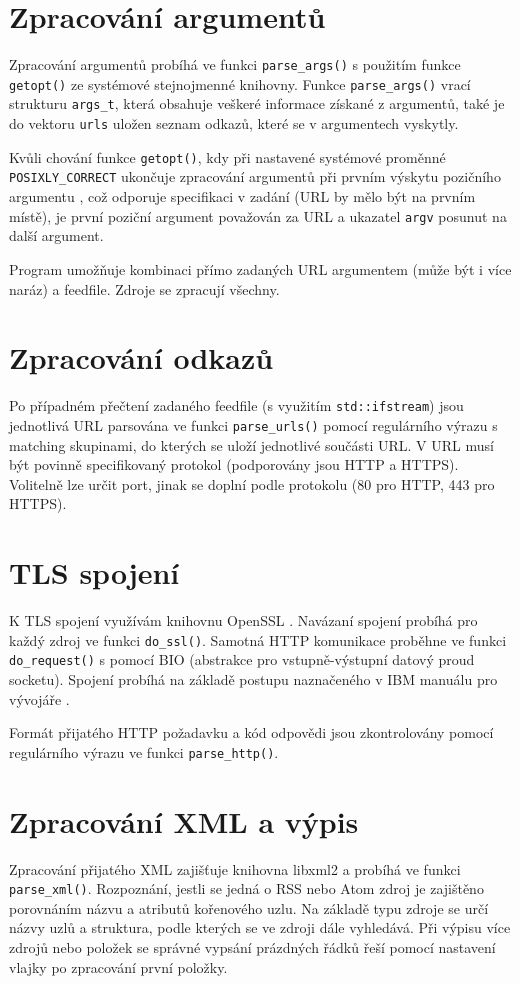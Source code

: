 \section{Zpracování argumentů}
Zpracování argumentů probíhá ve funkci \texttt{parse\_args()} s použitím funkce \texttt{getopt()} ze systémové stejnojmenné knihovny. Funkce \texttt{parse\_args()} vrací strukturu \texttt{args\_t}, která obsahuje veškeré informace získané z argumentů, také je do vektoru \texttt{urls} uložen seznam odkazů, které se v argumentech vyskytly.

Kvůli chování funkce \texttt{getopt()}, kdy při nastavené systémové proměnné\\ \texttt{POSIXLY\_CORRECT} ukončuje zpracování argumentů při prvním výskytu pozičního argumentu \cite{getopt}, což odporuje specifikaci v zadání (URL by mělo být na prvním místě), je první poziční argument považován za URL a ukazatel \texttt{argv} posunut na další argument.

Program umožňuje kombinaci přímo zadaných URL argumentem (může být i více naráz) a feedfile. Zdroje se zpracují všechny.

\section{Zpracování odkazů}
Po případném přečtení zadaného feedfile (s využitím \texttt{std::ifstream}) jsou jednotlivá URL parsována ve funkci \texttt{parse\_urls()} pomocí regulárního výrazu \cite{regex} s matching skupinami, do kterých se uloží jednotlivé součásti URL. V URL musí být povinně specifikovaný protokol (podporovány jsou HTTP a HTTPS). Volitelně lze určit port, jinak se doplní podle protokolu (80 pro HTTP, 443 pro HTTPS).

\section{TLS spojení}
K TLS spojení využívám knihovnu OpenSSL \cite{OpenSSL}. Navázaní spojení probíhá pro každý zdroj ve funkci \texttt{do\_ssl()}. Samotná HTTP komunikace proběhne ve funkci \texttt{do\_request()} s pomocí BIO (abstrakce pro vstupně-výstupní datový proud socketu). Spojení probíhá na základě postupu naznačeného v IBM manuálu pro vývojáře \cite{IBM}.

Formát přijatého HTTP požadavku a kód odpovědi jsou zkontrolovány pomocí regulárního výrazu ve funkci \texttt{parse\_http()}.

\section{Zpracování XML a výpis}
Zpracování přijatého XML zajišťuje knihovna libxml2 \cite{XML} a probíhá ve funkci \texttt{parse\_xml()}. Rozpoznání, jestli se jedná o RSS nebo Atom zdroj je zajištěno porovnáním názvu a atributů kořenového uzlu. Na základě typu zdroje se určí názvy uzlů a struktura, podle kterých se ve zdroji dále vyhledává. Při výpisu více zdrojů nebo položek se správné vypsání prázdných řádků řeší pomocí nastavení vlajky po zpracování první položky.

